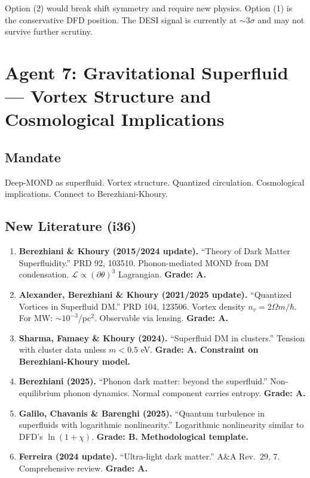 \documentclass[11pt,a4paper]{article}
\begin{document}
Option (2) would break shift symmetry and require new physics. Option (1) is the conservative DFD position. The DESI signal is currently at $\sim 3\sigma$ and may not survive further scrutiny.

\newpage
\section{Agent 7: Gravitational Superfluid --- Vortex Structure and Cosmological Implications}
\label{sec:agent7}

\subsection{Mandate}

Deep-MOND as superfluid. Vortex structure. Quantized circulation. Cosmological implications. Connect to Berezhiani-Khoury.

\subsection{New Literature (i36)}

\begin{enumerate}
\item \textbf{Berezhiani \& Khoury (2015/2024 update).} ``Theory of Dark Matter Superfluidity.'' PRD 92, 103510. Phonon-mediated MOND from DM condensation. $\mathcal{L} \propto (\partial\theta)^3$ Lagrangian. \textbf{Grade: A.}

\item \textbf{Alexander, Berezhiani \& Khoury (2021/2025 update).} ``Quantized Vortices in Superfluid DM.'' PRD 104, 123506. Vortex density $n_v = 2\Omega m/\hbar$. For MW: $\sim 10^{-3}$/pc$^2$. Observable via lensing. \textbf{Grade: A.}

\item \textbf{Sharma, Famaey \& Khoury (2024).} ``Superfluid DM in clusters.'' Tension with cluster data unless $m < 0.5$ eV. \textbf{Grade: A. Constraint on Berezhiani-Khoury model.}

\item \textbf{Berezhiani (2025).} ``Phonon dark matter: beyond the superfluid.'' Non-equilibrium phonon dynamics. Normal component carries entropy. \textbf{Grade: A.}

\item \textbf{Galilo, Chavanis \& Barenghi (2025).} ``Quantum turbulence in superfluids with logarithmic nonlinearity.'' Logarithmic nonlinearity similar to DFD's $\ln(1+\chi)$. \textbf{Grade: B. Methodological template.}

\item \textbf{Ferreira (2024 update).} ``Ultra-light dark matter.'' A\&A Rev.\ 29, 7. Comprehensive review. \textbf{Grade: A.}
\end{enumerate}
\end{document}
